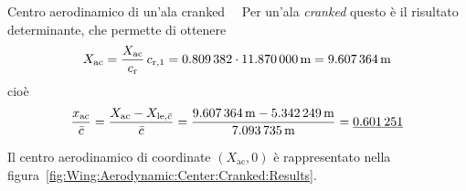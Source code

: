 \documentclass[[12pt,twoside]{book}
\begin{document}
\begin{myExampleX}{Centro aerodinamico di un'ala cranked}{\ \myIconGraph\ }
Per un'ala \emph{cranked} questo è il risultato determinante, che permette di
ottenere
\[
X_{\mathrm{ac}} = \frac{X_{\mathrm{ac}}}{c_\mathrm{r}} \, c_{\mathrm{r},1}
  = \SI[round-precision=3]{\myXACOverChordRootDatcomWing}{}
    \cdot \SI[round-precision=2]{\myChordRootWingIMT}{\metre}
  = \SI[round-precision=2]{\myACWingToApexWingMT}{\metre} 
\]
cioè
\[
\frac{x_{\mathrm{ac}}}{\bar{c}}
  = 
  \frac{
    X_{\mathrm{ac}} - X_{\mathrm{le},\bar{c}}
  }{
    \bar{c}
  }
  =
  \frac{
    \SI[round-precision=2]{\myACWingToApexWingMT}{\metre}
      - \SI[round-precision=2]{\myXXMACLEToApexWingCrankedMT}{\metre}
  }{
    \SI[round-precision=2]{\myMACWingCrankedMT}{\metre}
  }
  =
  \mathunderline{mydarkblue}{ \SI[round-precision=3]{\myXsiACWing}{} }  
\]

Il centro aerodinamico di coordinate $(X_\mathrm{ac},0)$
è rappresentato nella figura~\ref{fig:Wing:Aerodynamic:Center:Cranked:Results}.


\end{myExampleX}
\end{document}
